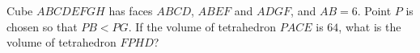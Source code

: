 Cube $ABCDEFGH$ has faces $ABCD$, $ABEF$ and $ADGF$, and $AB=6$. Point $P$ is chosen so that $PB<PG$. If the volume of tetrahedron $PACE$ is $64$, what is the volume of tetrahedron $FPHD$?
